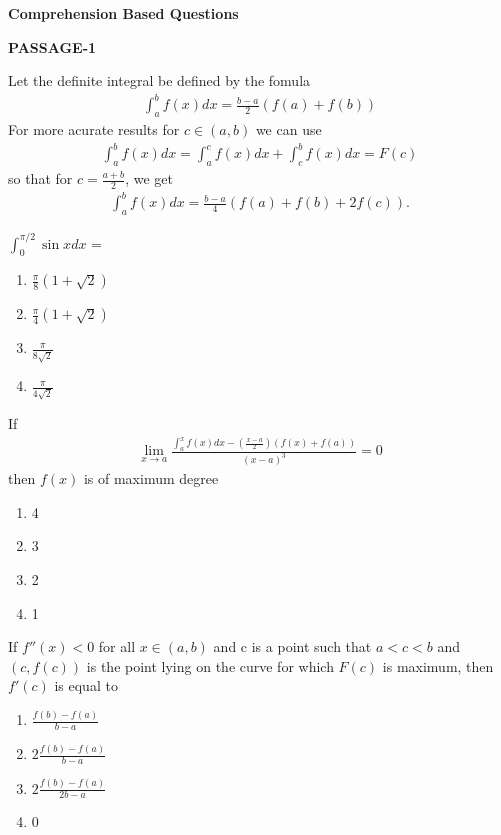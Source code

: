 \clearpage

\textbf{Comprehension Based Questions}

\textbf{PASSAGE-1}

Let the definite integral be defined by the fomula 
\begin{align*}
\int_{a}^{b}f(x)dx = \frac{b - a}{2}(f(a) + f(b))
\end{align*}
For more acurate results for $c \in (a, b)$ we can use
\begin{align*}
\int_{a}^{b}f(x)dx = \int_{a}^{c}f(x)dx + \int_{c}^{b}f(x)dx = F(c)
\end{align*}
so that for $c = \frac{a + b}{2}$, we get 
\begin{align*}
\int_{a}^{b}f(x)dx = \frac{b - a}{4}(f(a) + f(b) + 2f(c)).
\end{align*}

\item $\int_{0}^{\pi/2}\sin x dx$ = 
\begin{enumerate}
\item $\frac{\pi}{8}(1 + \sqrt{2})$
\item $\frac{\pi}{4}(1 + \sqrt{2})$
\item $\frac{\pi}{8\sqrt{2}}$
\item $\frac{\pi}{4\sqrt{2}}$
\end{enumerate}

\item If
\begin{align*}
\lim_{x \to a}\frac{\int_{a}^{x}f(x)dx - \left(\frac{x - a}{2}\right)(f(x) + f(a))}{(x - a)^3} = 0
\end{align*}
then $f(x)$ is of maximum degree
\begin{enumerate}
\item 4
\item 3
\item 2
\item 1
\end{enumerate}

\item If $f''(x) < 0$ for all $x \in (a, b)$ and c is a point such that $a < c < b$ and $(c, f(c))$ is the point lying on the curve for which $F(c)$ is maximum, then $f'(c)$ is equal to
\begin{enumerate}
\item $\frac{f(b) - f(a)}{b - a}$
\item $2\frac{f(b) - f(a)}{b - a}$
\item $2\frac{f(b) - f(a)}{2b - a}$
\item 0
\end{enumerate}

